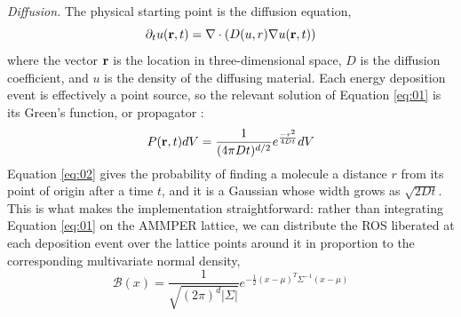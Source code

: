 \documentclass{asmarticle}
\begin{document}
\textit{Diffusion.} The physical starting point is the diffusion equation,
\begin{equation}
\partial_t u(\bold{r},t) = \nabla \cdot (D(u,r)\nabla u(\bold{r},t))\label{eq:01}
\end{equation}
where the vector $\bold{r}$ is the location in three-dimensional space, $D$ is the diffusion coefficient, and $u$ is the density of the diffusing material. Each energy deposition event is effectively a point source, so the relevant solution of Equation \ref{eq:01} is its Green's function, or propagator \cite{saxton2007modeling, boas1984mathematical}:
\begin{equation}
    P(\bold{r},t)dV = \frac{1}{(4\pi D t)^{d/2}}e^{\frac{-r^2}{4Dt}}dV \label{eq:02}
\end{equation}
Equation \ref{eq:02} gives the probability of finding a molecule a distance $r$ from its point of origin after a time $t$, and it is a Gaussian whose width grows as $\sqrt{2Dt}$. This is what makes the implementation straightforward: rather than integrating Equation \ref{eq:01} on the AMMPER lattice, we can distribute the ROS liberated at each deposition event over the lattice points around it in proportion to the corresponding multivariate normal density,
\begin{equation}
    \mathcal{B}(x) = \frac{1}{\sqrt{(2\pi)^d|\Sigma|}}e^{-\frac{1}{2}(x-\mu)^T\Sigma^{-1}(x-\mu)} \label{eq:mvn}
\end{equation}
\end{document}
